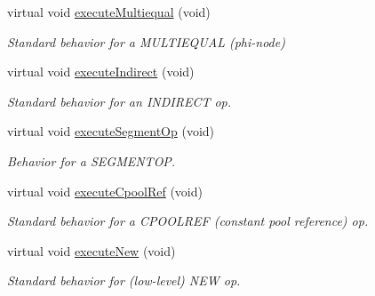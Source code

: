 \begin{DoxyCompactItemize}
virtual void \mbox{\hyperlink{class_emulate_pcode_op_a0d8951da9a7c253ad8bf4892fff9760a}{execute\+Multiequal}} (void)
\begin{DoxyCompactList}\small\item\em Standard behavior for a M\+U\+L\+T\+I\+E\+Q\+U\+AL (phi-\/node) \end{DoxyCompactList}\item 
virtual void \mbox{\hyperlink{class_emulate_pcode_op_ab092522c4b63f02b633dbeb98d9ecaba}{execute\+Indirect}} (void)
\begin{DoxyCompactList}\small\item\em Standard behavior for an I\+N\+D\+I\+R\+E\+CT op. \end{DoxyCompactList}\item 
virtual void \mbox{\hyperlink{class_emulate_pcode_op_a4335b878ca40061dcde8f45fabb82e16}{execute\+Segment\+Op}} (void)
\begin{DoxyCompactList}\small\item\em Behavior for a S\+E\+G\+M\+E\+N\+T\+OP. \end{DoxyCompactList}\item 
virtual void \mbox{\hyperlink{class_emulate_pcode_op_aa1075926534682debaaab82d47f51a03}{execute\+Cpool\+Ref}} (void)
\begin{DoxyCompactList}\small\item\em Standard behavior for a C\+P\+O\+O\+L\+R\+EF (constant pool reference) op. \end{DoxyCompactList}\item 
virtual void \mbox{\hyperlink{class_emulate_pcode_op_a7aecdf665942b8b429e02d3f56fce887}{execute\+New}} (void)
\begin{DoxyCompactList}\small\item\em Standard behavior for (low-\/level) N\+EW op. \end{DoxyCompactList}\end{DoxyCompactItemize}
